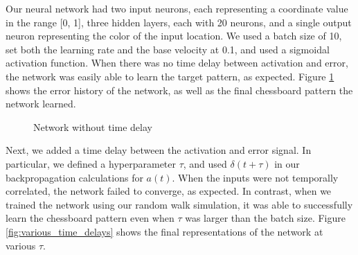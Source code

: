 \documentclass[12pt]{article}
\begin{document}
Our neural network had two input neurons, each representing a coordinate value in the range [0, 1], three hidden layers, each with 20 neurons, and a single output neuron representing the color of the input location. We used a batch size of 10, set both the learning rate and the base velocity at 0.1, and used a sigmoidal activation function. When there was no time delay between activation and error, the network was easily able to learn the target pattern, as expected. Figure \ref{fig:example} shows the error history of the network, as well as the final chessboard pattern the network learned.

\begin{figure}%
	\centering
	\qquad
	\caption{Network without time delay}%
	\label{fig:example}%
\end{figure}

Next, we added a time delay between the activation and error signal. In particular, we defined a hyperparameter $\tau$, and used $\delta(t+\tau)$ in our backpropagation calculations for $a(t)$. When the inputs were not temporally correlated, the network failed to converge, as expected. In contrast, when we trained the network using our random walk simulation, it was able to successfully learn the chessboard pattern even when $\tau$ was larger than the batch size. Figure \ref{fig:various_time_delays} shows the final representations of the network at various $\tau$.
\end{document}
